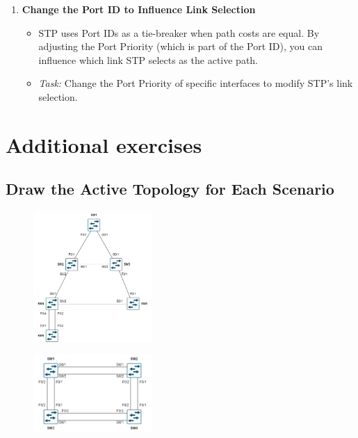 \documentclass[a4paper]{book}
\begin{document}
\begin{enumerate}
\begin{itemize}
    \end{itemize}

    \item \textbf{Change the Port ID to Influence Link Selection}
    \begin{itemize}
        \item STP uses Port IDs as a tie-breaker when path costs are equal. By adjusting the Port Priority (which is part of the Port ID), you can influence which link STP selects as the active path.
        \item \textit{Task:} Change the Port Priority of specific interfaces to modify STP’s link selection.
    \end{itemize}
    
\end{enumerate}

\newpage
\section*{Additional exercises}
\subsection*{Draw the Active Topology for Each Scenario}


\begin{figure}[h]
    \centering
    \includegraphics[width=0.4\textwidth]{img/stp03.png}
    \caption{\textit{}}
\end{figure}

\begin{figure}[h]
    \centering
    \includegraphics[width=0.4\textwidth]{img/stp04.png}
    \caption{\textit{}}
\end{figure}
\end{document}
